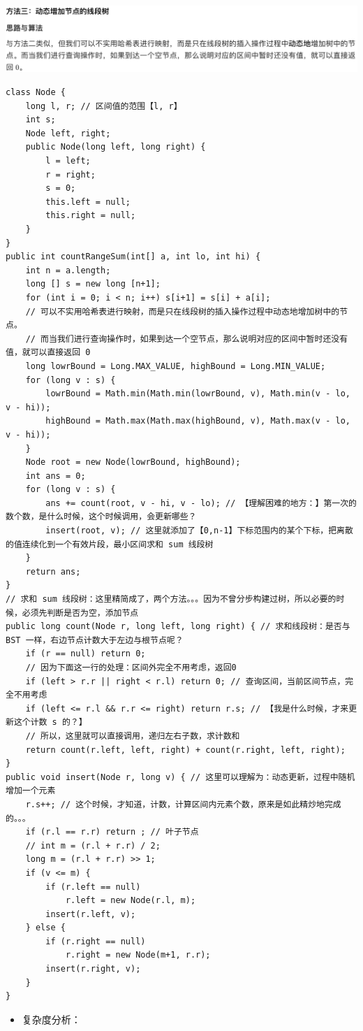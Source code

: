 \documentclass[9pt, b5paaper]{book}
\begin{document}
\begin{enumerate}
\includegraphics[width=.9\linewidth]{./pic/segmentTree_20230414_113119.png}
\begin{verbatim}
class Node {
    long l, r; // 区间值的范围【l, r】
    int s;
    Node left, right; 
    public Node(long left, long right) {
        l = left;
        r = right;
        s = 0;
        this.left = null;
        this.right = null;
    }
}
public int countRangeSum(int[] a, int lo, int hi) {
    int n = a.length;
    long [] s = new long [n+1];
    for (int i = 0; i < n; i++) s[i+1] = s[i] + a[i];
    // 可以不实用哈希表进行映射，而是只在线段树的插入操作过程中动态地增加树中的节点。
    // 而当我们进行查询操作时，如果到达一个空节点，那么说明对应的区间中暂时还没有值，就可以直接返回 0
    long lowrBound = Long.MAX_VALUE, highBound = Long.MIN_VALUE;
    for (long v : s) {
        lowrBound = Math.min(Math.min(lowrBound, v), Math.min(v - lo, v - hi));
        highBound = Math.max(Math.max(highBound, v), Math.max(v - lo, v - hi));
    }
    Node root = new Node(lowrBound, highBound);
    int ans = 0;
    for (long v : s) {
        ans += count(root, v - hi, v - lo); // 【理解困难的地方：】第一次的数个数，是什么时候，这个时候调用，会更新哪些？
        insert(root, v); // 这里就添加了【0,n-1】下标范围内的某个下标，把离散的值连续化到一个有效片段，最小区间求和 sum 线段树
    }
    return ans;
}
// 求和 sum 线段树：这里精简成了，两个方法。。。因为不曾分步构建过树，所以必要的时候，必须先判断是否为空，添加节点 
public long count(Node r, long left, long right) { // 求和线段树：是否与BST 一样，右边节点计数大于左边与根节点呢？
    if (r == null) return 0;
    // 因为下面这一行的处理：区间外完全不用考虑，返回0
    if (left > r.r || right < r.l) return 0; // 查询区间，当前区间节点，完全不用考虑
    if (left <= r.l && r.r <= right) return r.s; // 【我是什么时候，才来更新这个计数 s 的？】
    // 所以，这里就可以直接调用，递归左右子数，求计数和
    return count(r.left, left, right) + count(r.right, left, right);
}
public void insert(Node r, long v) { // 这里可以理解为：动态更新，过程中随机增加一个元素
    r.s++; // 这个时候，才知道，计数，计算区间内元素个数，原来是如此精炒地完成的。。。
    if (r.l == r.r) return ; // 叶子节点 
    // int m = (r.l + r.r) / 2;
    long m = (r.l + r.r) >> 1;
    if (v <= m) {
        if (r.left == null)
            r.left = new Node(r.l, m);
        insert(r.left, v);
    } else {
        if (r.right == null)
            r.right = new Node(m+1, r.r);
        insert(r.right, v);
    }
}
\end{verbatim}
\begin{itemize}
\item 复杂度分析：
\end{itemize}


\end{enumerate}
\end{document}
